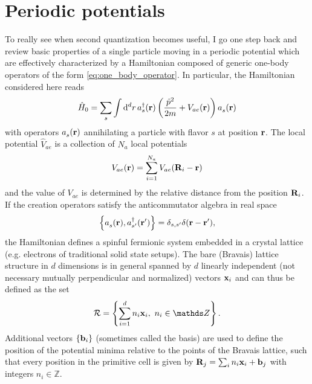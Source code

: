 \section{Periodic potentials}
\label{sec:periodic_potentials}
To really see when second quantization becomes useful, I go one step back and review basic properties of a single particle moving in a periodic potential which are effectively characterized by a Hamiltonian composed of generic one-body operators of the form \cref{eq:one_body_operator}.
In particular, the Hamiltonian considered here reads
\begin{align}
    \hat H_0 = \sum_s\int\rd^d r\, a^\dag_s({\bf r})\brlr{\frac{\hat p^2}{2m}+V_{ae}({\bf r})}a_s^\pdag({\bf r})
\end{align}
with operators $a^\pdag_s({\bf r})$ annihilating a particle with flavor $s$ at position $\bf r$.
The local potential $\hat V_{ae}$ is a collection of $N_a$ local potentials
\begin{align}
    V_{ae}({\bf r}) = \sum_{i=1}^{N_a}V_{ae}({\bf R}_i - {\bf r})
\end{align}
and the value of $V_{ae}$ is determined by the relative distance from the position ${\bf R}_i$.
If the creation operators satisfy the anticommutator algebra in real space
\begin{align}
    \anticommutator{a^\pdag_s({\bf r}),a^\dag_{s'}({\bf r'})}=\delta_{s,s'}\delta({\bf r}-{\bf r'}),
\end{align}
the Hamiltonian defines a spinful fermionic system embedded in a crystal lattice (e.g. electrons of traditional solid state setups).
The bare (Bravais) lattice structure in $d$ dimensions is in general spanned by $d$ linearly independent (not necessary mutually perpendicular and normalized) vectors ${\bf x}_i$ and can thus be defined as the set
\begin{align}
    \mathcal{R} = \anticommutator{\sum_{i=1}^d n_i {\bf x}_i,\ n_i\in\mathds Z}.
\end{align}
Additional vectors $\{{\bf b}_i\}$ (sometimes called the basis) are used to define the position of the potential minima relative to the points of the Bravais lattice, such that every position in the primitive cell is given by ${\bf R}_j = \sum_i n_i {\bf x}_i + {\bf b}_j$ with integers $n_i\in\mathds Z$.
